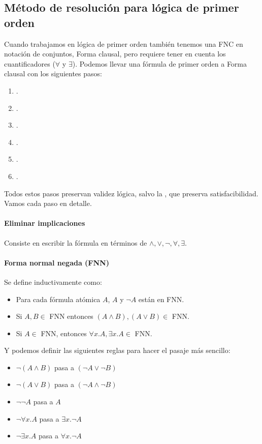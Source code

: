 \subsection{Método de resolución para lógica de primer orden}

Cuando trabajamos en lógica de primer orden también tenemos una FNC en notación de conjuntos, Forma clausal, pero requiere tener en cuenta los cuantificadores ($\forall$ y $\exists$). Podemos llevar una fórmula de primer orden a Forma clausal con los siguientes pasos:

\begin{enumerate}
  \item {}.
  \item {}.
  \item {}.
  \item {}.
  \item {}.
  \item {}.
\end{enumerate}

Todos estos pasos preservan validez lógica, salvo la , que preserva satisfacibilidad.
Vamos cada paso en detalle.

\paragraph{Eliminar implicaciones}

Consiste en escribir la fórmula en términos de $\land, \lor, \lnot, \forall, \exists$.

\paragraph{Forma normal negada (FNN)}

Se define inductivamente como:
\begin{itemize}
  \item Para cada fórmula atómica $A$, $A$ y $\lnot A$ están en FNN.
  \item Si $A, B \in$ FNN entonces $(A \land B), (A \lor B) \in$ FNN.
  \item Si $A \in$ FNN, entonces $\forall x.A, \exists x.A \in$ FNN.
\end{itemize}

Y podemos definir las siguientes reglas para hacer el pasaje más sencillo:
\begin{itemize}
  \item $\lnot (A \land B)$ pasa a $(\lnot A \lor \lnot B)$
  \item $\lnot (A \lor B)$ pasa a $(\lnot A \land \lnot B)$
  \item $\lnot\lnot A$ pasa a $A$
  \item $\lnot\forall x.A$ pasa a $\exists x.\lnot A$
  \item $\lnot\exists x.A$ pasa a $\forall x.\lnot A$
\end{itemize}

